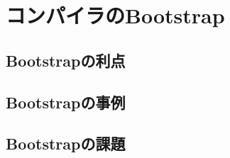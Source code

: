 \chapter{コンパイラのBootstrap}
\label{explain-bootstrap}

\section{Bootstrapの利点}
\label{explain-bootstrap:merit}

\section{Bootstrapの事例}
\label{explain-bootstrap:instance}

\section{Bootstrapの課題}
\label{explain-bootstrap:issue}

